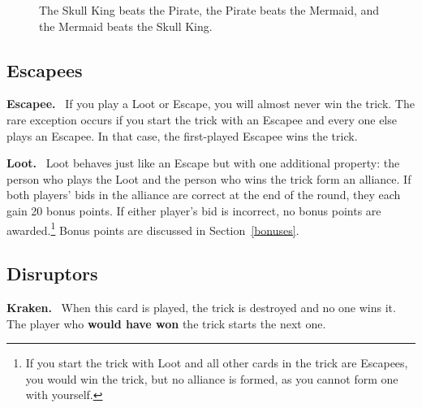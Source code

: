 \documentclass{article}
\newcommand{\block}[2][\medskip]{#1\noindent\textbf{#2.}\ }
\begin{document}
\begin{figure}[h]
\centering
{}

\caption{The Skull King beats the Pirate, the Pirate beats the Mermaid, and the Mermaid beats the Skull King.}
\label{trio}
\end{figure}

\subsection{Escapees}\label{escapees}
\block[]{Escapee}
If you play a Loot or Escape, you will almost never win the trick. The rare exception occurs if you start the trick with an Escapee and every one else plays an Escapee.
In that case, the first-played Escapee wins the trick.

\block{Loot}
Loot behaves just like an Escape but with one additional property: the person who plays the Loot and the person who wins the trick form an alliance. If both players' bids in
the alliance are correct at the end of the round, they each gain 20 bonus points. If either player's bid is incorrect, no bonus points are awarded.\footnote{If you start the trick with Loot and all other cards in the trick are Escapees, you would win the trick, but no alliance is formed, as you cannot form one with yourself.} Bonus points are discussed in Section~\ref{bonuses}.

\subsection{Disruptors}
\block[]{Kraken}
When this card is played, the trick is destroyed and no one wins it. The player who \textbf{would have won} the trick starts the next one.
\end{document}
